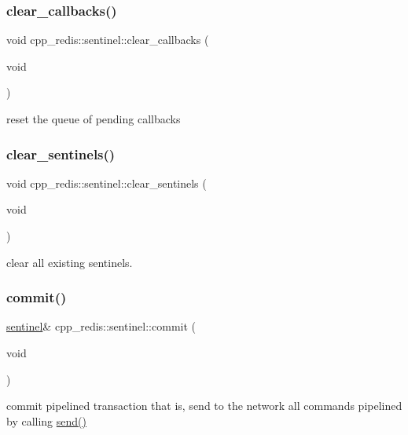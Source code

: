 \subsubsection{\texorpdfstring{clear\+\_\+callbacks()}{clear\_callbacks()}}
{\footnotesize\ttfamily void cpp\+\_\+redis\+::sentinel\+::clear\+\_\+callbacks (\begin{DoxyParamCaption}\item[{void}]{ }\end{DoxyParamCaption})\hspace{0.3cm}{\ttfamily [private]}}

reset the queue of pending callbacks \mbox{\label{classcpp__redis_1_1sentinel_ac36640b3f392970c72f5a513a2d61ac7}} 
\subsubsection{\texorpdfstring{clear\+\_\+sentinels()}{clear\_sentinels()}}
{\footnotesize\ttfamily void cpp\+\_\+redis\+::sentinel\+::clear\+\_\+sentinels (\begin{DoxyParamCaption}\item[{void}]{ }\end{DoxyParamCaption})}

clear all existing sentinels. \mbox{\label{classcpp__redis_1_1sentinel_ad4f85d486499f82225b244f85091b31e}} 
\subsubsection{\texorpdfstring{commit()}{commit()}}
{\footnotesize\ttfamily \hyperlink{classcpp__redis_1_1sentinel}{sentinel}\& cpp\+\_\+redis\+::sentinel\+::commit (\begin{DoxyParamCaption}\item[{void}]{ }\end{DoxyParamCaption})}

commit pipelined transaction that is, send to the network all commands pipelined by calling \hyperlink{classcpp__redis_1_1sentinel_a0df522dbd7debda4e73f616a62d6f5ee}{send()}

